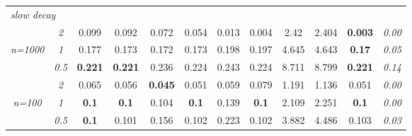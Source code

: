 \begin{table}[h!]
\begin{center}
\begin{tabular}{cc|cc|cc|cc|cc|c|c}
\multicolumn{2}{l|}{\it slow decay} &&&&&&&&&\\& \it  2  & 0.099 & 0.092 & 0.072 & 0.054 & 0.013 & 0.004 & 2.42 & 2.404 & {\bf 0.003} & \it  0.00 \\
\it n=1000  & \it  1  & 0.177 & 0.173 & 0.172 & 0.173 & 0.198 & 0.197 & 4.645 & 4.643 & {\bf 0.17} & \it  0.05 \\
& \it  0.5  & {\bf 0.221} & {\bf 0.221} & 0.236 & 0.224 & 0.243 & 0.224 & 8.711 & 8.799 & {\bf 0.221} & \it  0.14 \\[1ex]
\cline{2-2}\rule{0pt}{3ex}& \it  2  & 0.065 & 0.056 & {\bf 0.045} & 0.051 & 0.059 & 0.079 & 1.191 & 1.136 & 0.051 & \it  0.00 \\
\it n=100  & \it  1  & {\bf 0.1} & {\bf 0.1} & 0.104 & {\bf 0.1} & 0.139 & {\bf 0.1} & 2.109 & 2.251 & {\bf 0.1} & \it  0.00 \\
& \it  0.5  & {\bf 0.1} & 0.101 & 0.156 & 0.102 & 0.223 & 0.102 & 3.882 & 4.486 & 0.103 & \it  0.03 \\[1ex]
\hline\end{tabular}
\end{center}
\end{table}


